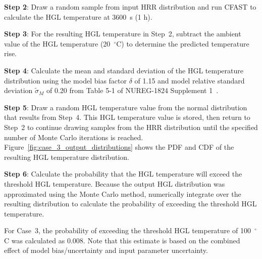 \documentclass[12pt]{article}
\begin{document}
\textbf{Step 2}: Draw a random sample from input HRR distribution and run CFAST to calculate the HGL temperature at 3600~s (1 h).

\textbf{Step 3}: For the resulting HGL temperature in Step~2, subtract the ambient value of the HGL temperature (20~$^\circ$C) to determine the predicted temperature rise.

\textbf{Step 4}: Calculate the mean and standard deviation of the HGL temperature distribution using the model bias factor $\delta$ of 1.15 and model relative standard deviation $\widetilde\sigma_M$ of 0.20 from Table 5-1 of NUREG-1824 Supplement 1~\cite{NUREG_1824_Sup_1}.

\textbf{Step 5}: Draw a random HGL temperature value from the normal distribution that results from Step~4. This HGL temperature value is stored, then return to Step~2 to continue drawing samples from the HRR distribution until the specified number of Monte Carlo iterations is reached. Figure~\ref{fig:case_3_output_distributions} shows the PDF and CDF of the resulting HGL temperature distribution.

\textbf{Step 6}: Calculate the probability that the HGL temperature will exceed the threshold HGL temperature. Because the output HGL distribution was approximated using the Monte Carlo method, numerically integrate over the resulting distribution to calculate the probability of exceeding the threshold HGL temperature.

For Case~3, the probability of exceeding the threshold HGL temperature of 100~$^\circ$C was calculated as 0.008. Note that this estimate is based on the combined effect of model bias/uncertainty and input parameter uncertainty.


\clearpage
\end{document}
